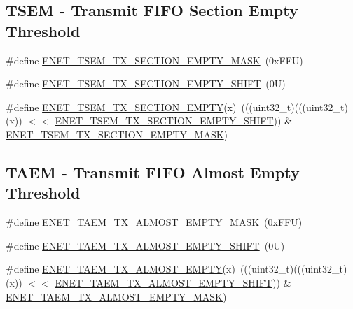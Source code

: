 \subsection*{T\+S\+EM -\/ Transmit F\+I\+FO Section Empty Threshold}
\begin{DoxyCompactItemize}
\item 
\#define \mbox{\hyperlink{group___e_n_e_t___register___masks_ga2e0f28c4f62db96b87ef5ad97474613d}{E\+N\+E\+T\+\_\+\+T\+S\+E\+M\+\_\+\+T\+X\+\_\+\+S\+E\+C\+T\+I\+O\+N\+\_\+\+E\+M\+P\+T\+Y\+\_\+\+M\+A\+SK}}~(0x\+F\+F\+U)
\item 
\#define \mbox{\hyperlink{group___e_n_e_t___register___masks_ga246af0bfb3c58b0af12dc0baf7142256}{E\+N\+E\+T\+\_\+\+T\+S\+E\+M\+\_\+\+T\+X\+\_\+\+S\+E\+C\+T\+I\+O\+N\+\_\+\+E\+M\+P\+T\+Y\+\_\+\+S\+H\+I\+FT}}~(0\+U)
\item 
\#define \mbox{\hyperlink{group___e_n_e_t___register___masks_gade2d164f1caaf77f9495ef0a25067e7e}{E\+N\+E\+T\+\_\+\+T\+S\+E\+M\+\_\+\+T\+X\+\_\+\+S\+E\+C\+T\+I\+O\+N\+\_\+\+E\+M\+P\+TY}}(x)~(((uint32\+\_\+t)(((uint32\+\_\+t)(x)) $<$$<$ \mbox{\hyperlink{group___e_n_e_t___register___masks_ga246af0bfb3c58b0af12dc0baf7142256}{E\+N\+E\+T\+\_\+\+T\+S\+E\+M\+\_\+\+T\+X\+\_\+\+S\+E\+C\+T\+I\+O\+N\+\_\+\+E\+M\+P\+T\+Y\+\_\+\+S\+H\+I\+FT}})) \& \mbox{\hyperlink{group___e_n_e_t___register___masks_ga2e0f28c4f62db96b87ef5ad97474613d}{E\+N\+E\+T\+\_\+\+T\+S\+E\+M\+\_\+\+T\+X\+\_\+\+S\+E\+C\+T\+I\+O\+N\+\_\+\+E\+M\+P\+T\+Y\+\_\+\+M\+A\+SK}})
\end{DoxyCompactItemize}
\subsection*{T\+A\+EM -\/ Transmit F\+I\+FO Almost Empty Threshold}
\begin{DoxyCompactItemize}
\item 
\#define \mbox{\hyperlink{group___e_n_e_t___register___masks_ga477a6ff29213fd6111ad7c072547a40d}{E\+N\+E\+T\+\_\+\+T\+A\+E\+M\+\_\+\+T\+X\+\_\+\+A\+L\+M\+O\+S\+T\+\_\+\+E\+M\+P\+T\+Y\+\_\+\+M\+A\+SK}}~(0x\+F\+F\+U)
\item 
\#define \mbox{\hyperlink{group___e_n_e_t___register___masks_ga7c41b19807f3598aa5cee0bf72c6c03f}{E\+N\+E\+T\+\_\+\+T\+A\+E\+M\+\_\+\+T\+X\+\_\+\+A\+L\+M\+O\+S\+T\+\_\+\+E\+M\+P\+T\+Y\+\_\+\+S\+H\+I\+FT}}~(0\+U)
\item 
\#define \mbox{\hyperlink{group___e_n_e_t___register___masks_ga985ae361e883de48b09f629a84cff541}{E\+N\+E\+T\+\_\+\+T\+A\+E\+M\+\_\+\+T\+X\+\_\+\+A\+L\+M\+O\+S\+T\+\_\+\+E\+M\+P\+TY}}(x)~(((uint32\+\_\+t)(((uint32\+\_\+t)(x)) $<$$<$ \mbox{\hyperlink{group___e_n_e_t___register___masks_ga7c41b19807f3598aa5cee0bf72c6c03f}{E\+N\+E\+T\+\_\+\+T\+A\+E\+M\+\_\+\+T\+X\+\_\+\+A\+L\+M\+O\+S\+T\+\_\+\+E\+M\+P\+T\+Y\+\_\+\+S\+H\+I\+FT}})) \& \mbox{\hyperlink{group___e_n_e_t___register___masks_ga477a6ff29213fd6111ad7c072547a40d}{E\+N\+E\+T\+\_\+\+T\+A\+E\+M\+\_\+\+T\+X\+\_\+\+A\+L\+M\+O\+S\+T\+\_\+\+E\+M\+P\+T\+Y\+\_\+\+M\+A\+SK}})
\end{DoxyCompactItemize}
